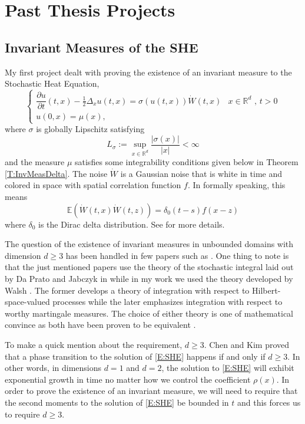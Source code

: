 \documentclass[a4paper,11pt]{article}
\numberwithin{equation}{section}
\theoremstyle{plain}
\theoremstyle{definition}
\newcommand{\R}{\mathbb{R}}
\numberwithin{NQ}{section}
\numberwithin{LQ}{section}
\numberwithin{ZQ}{section}
\begin{document}
\section{Past Thesis Projects}
\subsection{Invariant Measures of the SHE}
\hspace{\parindent} My first project dealt with proving the existence of an invariant measure to the Stochastic Heat Equation,
	\begin{equation}
	\label{E:SHE}
		\begin{cases}
		\dfrac{\partial u}{\partial t}(t,x)-\frac{1}{2}\Delta_x u(t,x) = \sigma(u(t,x))\dot W(t,x) & 	\text{$x\in \R^d$ , $t>0$}
		\\ u(0,x)=\mu(x) ,
		\end{cases}
	\end{equation}
where $\sigma$ is globally Lipschitz satisfying 
	\[
		L_\sigma := \sup_{x\in \R^d} \frac{|\sigma(x)|}{|x|} < \infty 
	\]
and the measure $\mu$ satisfies some integrability conditions given below in Theorem \ref{T:InvMeasDelta}. The noise $\dot{W}$ is a Gaussian noise that is white in time and colored in space with spatial correlation function $f$. In formally speaking, this means 
	\[
		\mathbb{E}\left(\dot{W}(t,x)\dot{W}(t,z)\right) = \delta_0(t-s)f(x-z)
	\]
where $\delta_0$ is the Dirac delta distribution. See \cite[pg. 51]{DalangEtc09Minicourse} for more details. 

The question of the existence of invariant measures in unbounded domains with dimension $d \ge 3$ has been handled in few papers such as \cite{TessitoreZabczyk98M, AM03, MSY15, MSY16}. One thing to note is that the just mentioned papers use the theory of the stochastic integral laid out by Da Prato and Jabczyk in \cite{DZ92} while in my work we used the theory developed by Walsh \cite{Walsh}. The former develops a theory of integration with respect to Hilbert-space-valued processes while the later emphasizes integration with respect to worthy martingale measures. The choice of either theory is one of mathematical convince as both have been proven to be equivalent  \cite{DalQuer}.

To make a quick mention about the requirement, $d \ge 3$. Chen and Kim \cite[Theorem 1.3]{CK15SHE} proved that a phase transition to the solution of \eqref{E:SHE} happens if and only if $d \ge 3$. In other words, in dimensions $d=1$ and $d=2$, the solution to \eqref{E:SHE} will exhibit exponential growth in time no matter how we control the coefficient $\rho(x)$. In order to prove the existence of an invariant measure, we will need to require that the second moments to the solution of \eqref{E:SHE} be bounded in $t$ and this forces us to require $d \ge 3$.   
\end{document}
